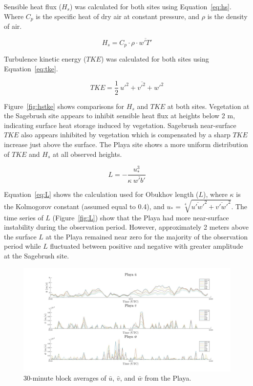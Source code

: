 \documentclass[]{article}
\begin{document}
Sensible heat flux ($H_s$) was calculated for both sites using Equation~\ref{eq:hs}. Where $C_p$ is the specific heat of dry air at constant pressure, and $\rho$ is the density of air.

\begin{equation}
H_s = C_p \cdot \rho \cdot \overline{w'T'}
\label{eq:hs}
\end{equation}

Turbulence kinetic energy ($TKE$) was calculated for both sites using Equation~\ref{eq:tke}. 

\begin{equation}
TKE = \frac{1}{2}~ \overline{u'^2 + v'^2 + w'^2}
\label{eq:tke}
\end{equation}

Figure~\ref{fig:hstke} shows comparisons for $H_s$ and $TKE$ at both sites. Vegetation at the Sagebrush site appears to inhibit sensible heat flux at heights below 2 m, indicating surface heat storage induced by vegetation. Sagebrush near-surface $TKE$ also appears inhibited by vegetation which is compensated by a sharp $TKE$ increase just above the surface. The Playa site shows a more uniform distribution of $TKE$ and $H_s$ at all observed heights.

\begin{equation}
L = -\frac{u_*^3}{\kappa~ \overline{w'b'}}
\label{eq:L}
\end{equation}

Equation~\ref{eq:L} shows the calculation used for Obukhov length ($L$), where $\kappa$ is the Kolmogorov constant (assumed equal to 0.4), and $u_* = \sqrt[4]{\overline{u'w'}^2 + \overline{v'w'}^2}$. The time series of $L$ (Figure~\ref{fig:L}) show that the Playa had more near-surface instability during the observation period. However, approximately 2 meters above the surface $L$ at the Playa remained near zero for the majority of the observation period while $L$ fluctuated between positive and negative with greater amplitude at the Sagebrush site. 

\begin{figure}
	\centering
	\includegraphics[width=\textwidth]{playarotate}
	\caption{30-minute block averages of $\bar{u}$, $\bar{v}$, and $\bar{w}$ from the Playa.}
	\label{fig:playarotate}
\end{figure}
\end{document}
